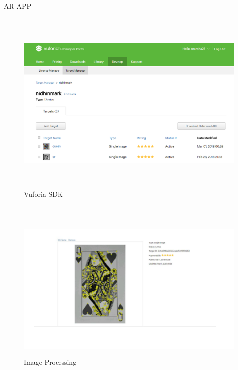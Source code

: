 AR APP
\begin{figure}[H]
	
	\centering
	\includegraphics[width=\linewidth,height=9cm] {./images/p21.png}
	\caption{Vuforia SDK}
	\label{manual}
\end{figure}\\


\begin{figure}[H]
	
	\centering
	\includegraphics[width=\linewidth,height=7cm] {./images/p25.png}
	\caption{Image Processing}
	\label{manual}
\end{figure}\\


